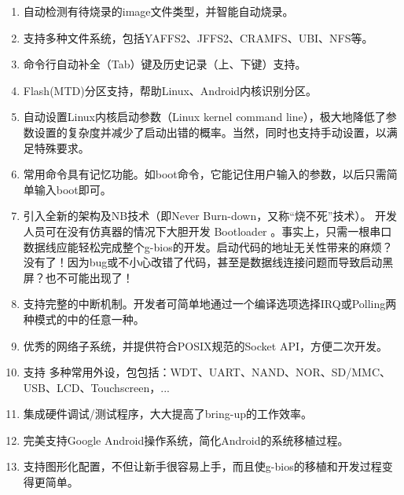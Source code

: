 \begin{enumerate}\setlength{\itemsep}{-\itemsep}
\item 自动检测有待烧录的image文件类型，并智能自动烧录。
\item 支持多种文件系统，包括YAFFS2、JFFS2、CRAMFS、UBI、NFS等。
\item 命令行自动补全（Tab）键及历史记录（上、下键）支持。
\item Flash(MTD)分区支持，帮助Linux、Android内核识别分区。
\item 自动设置Linux内核启动参数（Linux kernel command line），极大地降低了参数设置的复杂度并减少了启动出错的概率。当然，同时也支持手动设置，以满足特殊要求。
\item 常用命令具有记忆功能。如boot命令，它能记住用户输入的参数，以后只需简单输入boot即可。
\item 引入全新的架构及NB技术（即Never Burn-down，又称``烧不死''技术）。
开发人员可在没有仿真器的情况下大胆开发
Bootloader
。事实上，只需一根串口数据线应能轻松完成整个g-bios的开发。启动代码的地址无关性带来的麻烦？没有了！因为bug或不小心改错了代码，甚至是数据线连接问题而导致启动黑屏？也不可能出现了！
\item 支持完整的中断机制。开发者可简单地通过一个编译选项选择IRQ或Polling两种模式的中的任意一种。
\item 优秀的网络子系统，并提供符合POSIX规范的Socket API，方便二次开发。
\item 支持
多种常用外设，包包括：WDT、UART、NAND、NOR、SD/MMC、USB、LCD、Touchscreen，...
\item 集成硬件调试/测试程序，大大提高了bring-up的工作效率。
\item 完美支持Google Android操作系统，简化Android的系统移植过程。
\item 支持图形化配置，不但让新手很容易上手，而且使g-bios的移植和开发过程变得更简单。
\end{enumerate}

